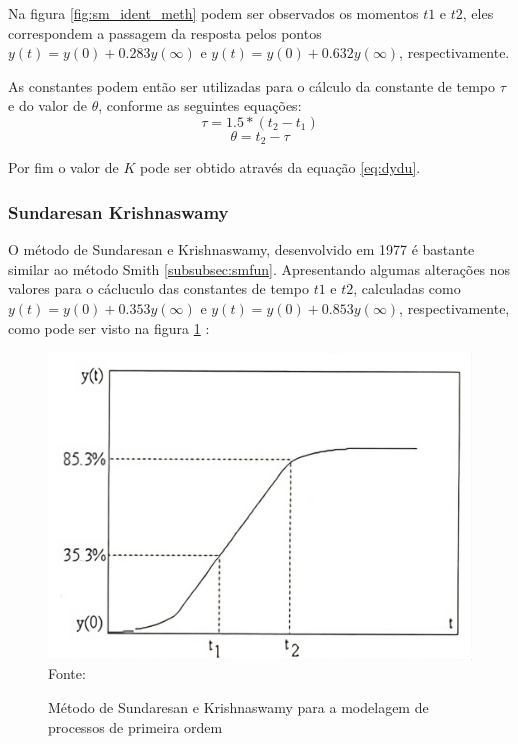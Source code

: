 Na figura \ref{fig:sm_ident_meth} podem ser observados os momentos $t1$ e $t2$, eles correspondem a passagem da resposta
pelos pontos $y(t) = y(0) + 0.283y(\infty)$ e $y(t) = y(0) + 0.632y(\infty)$, respectivamente.

As constantes podem então ser utilizadas para o cálculo da constante de tempo $\tau$ e do valor de $\theta$,
conforme as seguintes equações:
\begin{equation}
    \label{eq:smtau}
    \tau = 1.5*(t_2 - t_1)
\end{equation}
\begin{equation}
    \label{eq:smtheta}
    \theta = t_2 - \tau
\end{equation}

Por fim o valor de $K$ pode ser obtido através da equação \eqref{eq:dydu}.

\subsubsection{Sundaresan Krishnaswamy}

O método de Sundaresan e Krishnaswamy, desenvolvido em 1977 é bastante similar ao método Smith \ref{subsubsec:smfun}.
Apresentando algumas alterações nos valores para o cácluculo das constantes de tempo $t1$ e $t2$, calculadas como
$y(t) = y(0) + 0.353y(\infty)$ e $y(t) = y(0) + 0.853y(\infty)$, respectivamente, como pode ser visto na figura
\ref{fig:sd_kr_ident_meth} \cite{CoelhoIdentificacao}:


\begin{figure}[H]
    \centering
    \caption{Método de Sundaresan e Krishnaswamy para a modelagem de processos de primeira ordem }
    \includegraphics[scale=0.3]{figuras/sd_kr_ident_meth}
    \label{fig:sd_kr_ident_meth}
    \\
    \vspace{0cm}\hspace{0cm}\small{Fonte: \cite{CoelhoIdentificacao}}
\end{figure}

